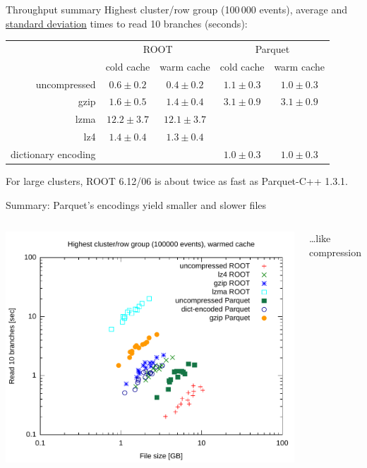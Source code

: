 \documentclass[aspectratio=169]{beamer}
\begin{document}
\begin{frame}{Throughput summary}
\vspace{0.35 cm}
Highest cluster/row group (100\,000 events), average and \underline{standard deviation} times to read 10 branches (seconds):

\renewcommand{\arraystretch}{1.2}

\begin{center}
\begin{tabular}{r c c c c}
                    & \multicolumn{2}{c}{ROOT} & \multicolumn{2}{c}{Parquet} \\
                    &  cold cache    &  warm cache    & cold cache    & warm cache    \\\hline
uncompressed        &  $0.6 \pm 0.2$ &  $0.4 \pm 0.2$ & $1.1 \pm 0.3$ & $1.0 \pm 0.3$ \\
gzip                &  $1.6 \pm 0.5$ &  $1.4 \pm 0.4$ & $3.1 \pm 0.9$ & $3.1 \pm 0.9$ \\
lzma                & $12.2 \pm 3.7$ & $12.1 \pm 3.7$ &               &               \\
lz4                 &  $1.4 \pm 0.4$ &  $1.3 \pm 0.4$ &               &               \\
dictionary encoding &                &                & $1.0 \pm 0.3$ & $1.0 \pm 0.3$ \\
\end{tabular}
\end{center}

\vspace{0.25 cm}
For large clusters, ROOT 6.12/06 is about twice as fast as Parquet-C++ 1.3.1.
\end{frame}

\begin{frame}{Summary: Parquet's encodings yield smaller and slower files}
\vspace{0.15 cm}\Large
\begin{columns}
\includegraphics[width=\linewidth]{root-parquet-size-throughput.pdf}

\ldots like compression
\end{columns}
\end{frame}
\end{document}

